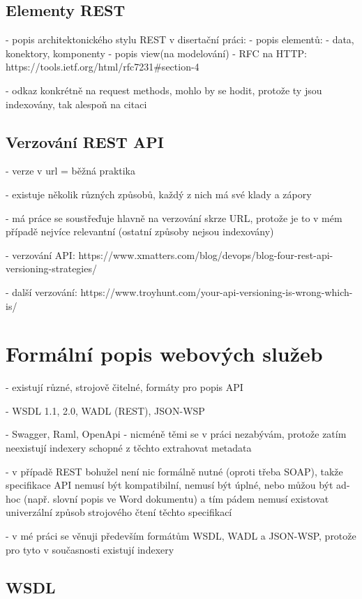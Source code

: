 \documentclass[czech,DP]{thesiskiv}
\begin{document}
\subsection{Elementy REST}
- popis architektonického stylu REST v disertační práci\cite{fielding2000rest}:
- popis elementů:
- data, konektory, komponenty
- popis view(na modelování)
- RFC na HTTP: https://tools.ietf.org/html/rfc7231\#section-4

- odkaz konkrétně na request methods, mohlo by se hodit, protože ty jsou indexovány, tak alespoň na citaci

\subsection{Verzování REST API}

- verze v url =  běžná praktika \cite{restApiVersion}

- existuje několik různých způsobů, každý z nich má své klady a zápory

- má práce se soustřeďuje hlavně na verzování skrze URL, protože je to v mém případě nejvíce relevantní (ostatní způsoby nejsou indexovány)

- verzování API: https://www.xmatters.com/blog/devops/blog-four-rest-api-versioning-strategies/

- další verzování: https://www.troyhunt.com/your-api-versioning-is-wrong-which-is/


\section{Formální popis webových služeb}

- existují různé, strojově čitelné, formáty pro popis API

- WSDL 1.1, 2.0, WADL (REST), JSON-WSP

- Swagger, Raml, OpenApi
	- nicméně těmi se v práci nezabývám, protože zatím neexistují indexery schopné z těchto extrahovat metadata

- v případě REST bohužel není nic formálně nutné (oproti třeba SOAP), takže specifikace API nemusí být kompatibilní, nemusí být úplné, nebo můžou být ad-hoc (např. slovní popis ve Word dokumentu) a tím pádem nemusí existovat univerzální způsob strojového čtení těchto specifikací

- v mé práci se věnuji především formátům WSDL, WADL a JSON-WSP, protože pro tyto v současnosti existují indexery

\subsection{WSDL}
\end{document}
